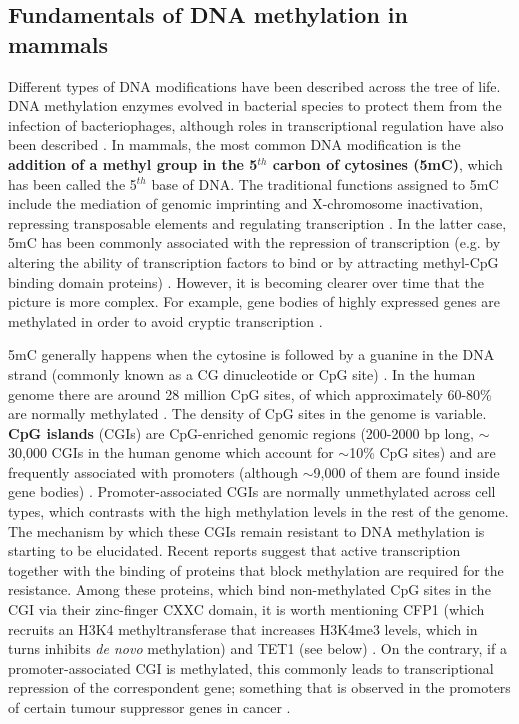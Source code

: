 \smallskip

\subsection{Fundamentals of DNA methylation in mammals} \label{s:1.2.2}

\smallskip

Different types of DNA modifications have been described across the tree of life. DNA methylation enzymes evolved in bacterial species to protect them from the infection of bacteriophages, although roles in transcriptional regulation have also been described  \cite{Sanchez-Romero2015}. In mammals, the most common DNA modification is the \textbf{addition of a methyl group in the 5$^{th}$ carbon of cytosines (\acrshort{5mC})}, which has been called the 5$^{th}$ base of DNA. The traditional functions assigned to 5mC include the mediation of genomic imprinting and X-chromosome inactivation, repressing transposable elements and regulating transcription \cite{Wu2017}. In the latter case, 5mC has been commonly associated with the repression of transcription (e.g. by altering the ability of transcription factors to bind or by attracting methyl-CpG binding domain proteins) \cite{Li2014}. However, it is becoming clearer over time that the picture is more complex. For example, gene bodies of highly expressed genes are methylated in order to avoid cryptic transcription \cite{Neri2017}.

\bigskip

5mC generally happens when the cytosine is followed by a guanine in the DNA strand (commonly known as a CG dinucleotide or CpG site) \cite{Li2014,Smith2013}. In the human genome there are around 28 million CpG sites, of which approximately 60-80\% are normally methylated \cite{Smith2013}. The density of CpG sites in the genome is variable. \textbf{CpG islands} (\acrshort{CGI}s) are CpG-enriched genomic regions (200-2000 bp long, $\sim$30,000 CGIs in the human genome which account for $\sim$10\% CpG sites) and are frequently associated with promoters (although $\sim$9,000 of them are found inside gene bodies) \cite{Smith2013,Jeziorska2017,Zeng2014}. Promoter-associated CGIs are normally unmethylated across cell types, which contrasts with the high methylation levels in the rest of the genome. The mechanism by which these CGIs remain resistant to DNA methylation is starting to be elucidated. Recent reports suggest that active transcription together with the binding of proteins that block methylation are required for the resistance. Among these proteins, which bind non-methylated CpG sites in the CGI via their zinc-finger CXXC domain, it is worth mentioning CFP1 (which recruits an H3K4 methyltransferase that increases H3K4me3 levels, which in turns inhibits \textit{de novo} methylation) and TET1 (see below) \cite{Takahashi2017}. On the contrary, if a promoter-associated CGI is methylated, this commonly leads to transcriptional repression of the correspondent gene; something that is observed in the promoters of certain tumour suppressor genes in cancer \cite{Flavahan2017}. 

